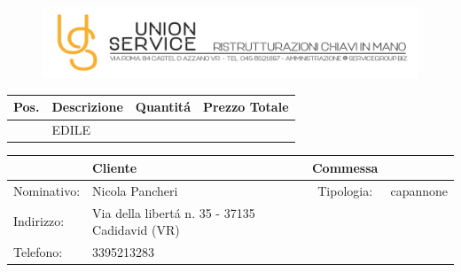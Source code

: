 \documentclass[pdftex,11pt,a4paper]{article}
\begin{document}
\begin{figure}[!t]
\includegraphics[width=\textwidth]{intestazioneAlta.jpg}
\end{figure}

\begin{center}
  \begin{tabular}{| p{1cm} | p{5cm} | l | l |}
    \hline
      \textbf{Pos.} & \textbf{Descrizione} & \textbf{Quantit\'a}  & \textbf{Prezzo Totale} \\ \hline
      & EDILE & & \\ \hline
    \hline
  \end{tabular}
\end{center}

\begin{center}
  \begin{tabular}{| l  l | c  l|}
    \hline
      & Cliente & Commessa &  \\ \hline
    Nominativo: & Nicola Pancheri & Tipologia: & capannone \\
    Indirizzo: &  Via della libert\'a n. 35 - 37135 Cadidavid (VR) &  & \\
    Telefono: &  3395213283 & &\\
    \hline
  \end{tabular}
\end{center}
\end{document}

